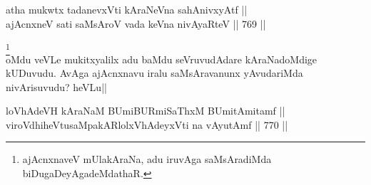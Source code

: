 
\begin{shl}
atha mukwtx tadanevxVti kAraNeVna sahAnivxyAtf || \\
ajAcnxneV sati saMsAroV vada keVna nivAyaRteV ||  769 ||  
\end{shl}

\begin{artha} 
\footnote[1]{ajAcnxnaveV mUlakAraNa, adu iruvAga saMsAradiMda 
biDugaDeyAgadeMdathaR.}\\
oMdu veVLe mukitxyalilx adu baMdu seVruvudAdare kAraNadoMdige 
kUDuvudu. AvAga ajAcnxnavu iralu saMsAravanunx yAvudariMda 
nivArisuvudu? heVLu||
\end{artha}


\begin{shl}
loVhAdeVH kAraNaM BUmiBURmiSaThxM BUmitAmitamf || \\
viroVdhiheVtusaMpakARlolxVhAdeyxVti na vAyutAmf ||  770 ||  
\end{shl}

